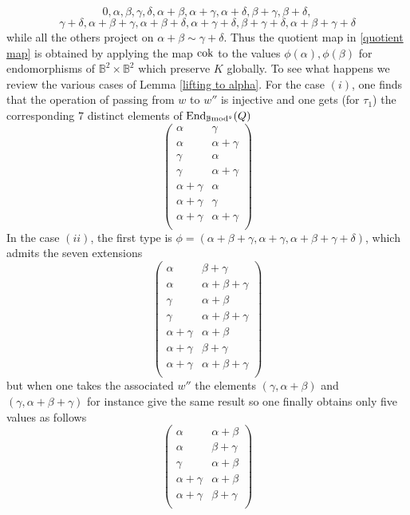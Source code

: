 \documentclass[12pt]{article}
\def\End{{\rm End}}
\def\scoker{{\rm cok}}
\def\B{{\mathbb B}}
\def\End{{\mbox{End}}}
\def\b2{{\rm \B mod^{\mathfrak s}}}
\begin{document}
$$
0,\alpha ,\beta ,\gamma ,\delta ,\alpha +\beta ,\alpha +\gamma ,\alpha +\delta ,\beta +\gamma ,\beta +\delta,$$ $$ \gamma +\delta ,\alpha +\beta +\gamma ,\alpha +\beta +\delta ,\alpha +\gamma +\delta ,\beta +\gamma +\delta ,\alpha +\beta +\gamma +\delta 
$$
 while all the others project on $\alpha +\beta\sim \gamma +\delta$. Thus the quotient map
 in \eqref{quotient map} is obtained by applying the map $\scoker$ to the values $\phi(\alpha),\phi(\beta)$ for endomorphisms of $\B^2\times \B^2$ which preserve $K$ globally. To see what happens we review the various cases of Lemma \ref{lifting to alpha}. For the case $(i)$, one finds that the operation of passing from $w$ to $w''$ is injective and one gets (for $\tau_1$)  the corresponding $7$ distinct elements of $\End_\b2(Q)$ 
 $$
 \left(
\begin{array}{cc}
 \alpha  & \gamma  \\
 \alpha  & \alpha +\gamma  \\
 \gamma  & \alpha  \\
 \gamma  & \alpha +\gamma  \\
 \alpha +\gamma  & \alpha  \\
 \alpha +\gamma  & \gamma  \\
 \alpha +\gamma  & \alpha +\gamma  \\
\end{array}
\right)
$$
In the case $(ii)$, the first type is $\phi=(\alpha +\beta +\gamma ,\alpha +\gamma ,\alpha +\beta +\gamma +\delta )$, which admits the seven extensions 
$$
\left(
\begin{array}{cc}
 \alpha  & \beta +\gamma  \\
 \alpha  & \alpha +\beta +\gamma  \\
 \gamma  & \alpha +\beta  \\
 \gamma  & \alpha +\beta +\gamma  \\
 \alpha +\gamma  & \alpha +\beta  \\
 \alpha +\gamma  & \beta +\gamma  \\
 \alpha +\gamma  & \alpha +\beta +\gamma  \\
\end{array}
\right)
$$
but when one takes the associated $w''$ the elements $(\gamma  , \alpha +\beta) $ and $(\gamma  , \alpha +\beta+\gamma) $ for instance give the same result so one finally obtains only five values as follows
$$
 \left(
\begin{array}{cc}
 \alpha  & \alpha +\beta  \\
 \alpha  & \beta +\gamma  \\
 \gamma  & \alpha +\beta  \\
 \alpha +\gamma  & \alpha +\beta  \\
 \alpha +\gamma  & \beta +\gamma  \\
\end{array}
\right)
$$
\end{document}
